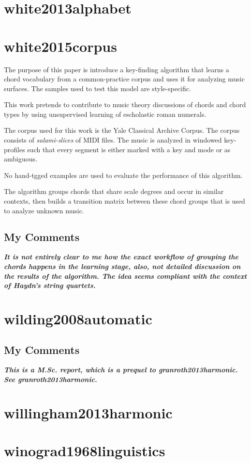 \section{white2013alphabet }
\section{white2015corpus }
  The purpose of this paper is introduce a key-finding algorithm that learns a chord vocabulary from a common-practice corpus and uses it for analyzing music surfaces. The samples used to test this model are style-specific.

  This work pretends to contribute to music theory discussions of chords and chord types by using unsupervised learning of escholastic roman numerals.

  The corpus used for this work is the Yale Classical Archive Corpus. The corpus consists of \emph{salami-slices} of MIDI files. The music is analyzed in windowed key-profiles such that every segment is either marked with a key and mode or as ambiguous.

  No hand-tgged examples are used to evaluate the performance of this algorithm.

  The algorithm groups chords that share scale degrees and occur in similar contexts, then builds a transition matrix between these chord groups that is used to analyze unknown music.

  \subsection{My Comments}
    \emph{\textbf{
      It is not entirely clear to me how the exact workflow of grouping the chords happens in the learning stage, also, not detailed discussion on the results of the algorithm. The idea seems compliant with the context of Haydn's string quartets.
    }}
\section{wilding2008automatic }
  \subsection{My Comments}
    \emph{\textbf{
      This is a M.Sc. report, which is a prequel to granroth2013harmonic. See granroth2013harmonic.
    }}
\section{willingham2013harmonic }
\section{winograd1968linguistics }

\newpage
